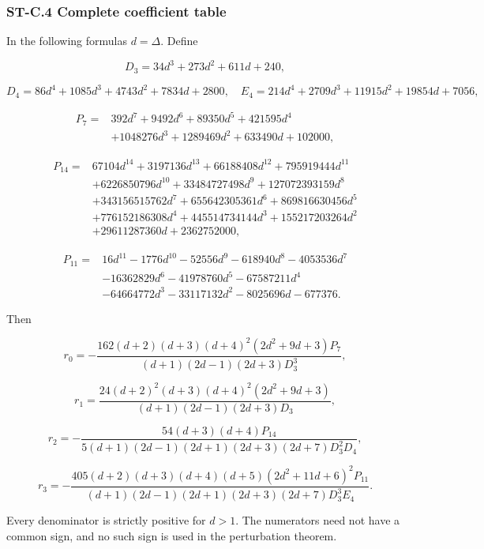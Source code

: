 \documentclass[a4paper,11pt]{article}
\numberwithin{equation}{section}
\begin{document}
\hypertarget{st-c.4-complete-coefficient-table}{%
\subsubsection{ST-C.4 Complete coefficient table}\label{st-c.4-complete-coefficient-table}}

In the following formulas \(d=\Delta\). Define

\[
D_3=34d^3+273d^2+611d+240,
\]

\[
D_4=86d^4+1085d^3+4743d^2+7834d+2800,
\quad
E_4=214d^4+2709d^3+11915d^2+19854d+7056,
\]

\[
\begin{aligned}
P_7={}&392d^7+9492d^6+89350d^5+421595d^4\\
&+1048276d^3+1289469d^2+633490d+102000,
\end{aligned}
\]

\[
\begin{aligned}
P_{14}={}&67104d^{14}+3197136d^{13}+66188408d^{12}
+795919444d^{11}\\
&+6226850796d^{10}+33484727498d^9+127072393159d^8\\
&+343156515762d^7+655642305361d^6+869816630456d^5\\
&+776152186308d^4+445514734144d^3+155217203264d^2\\
&+29611287360d+2362752000,
\end{aligned}
\]

\[
\begin{aligned}
P_{11}={}&16d^{11}-1776d^{10}-52556d^9-618940d^8-4053536d^7\\
&-16362829d^6-41978760d^5-67587211d^4\\
&-64664772d^3-33117132d^2-8025696d-677376.
\end{aligned}
\]

Then

\[
r_0=-\frac{162(d+2)(d+3)(d+4)^2(2d^2+9d+3)P_7}
{(d+1)(2d-1)(2d+3)D_3^3},
\]

\[
r_1=\frac{24(d+2)^2(d+3)(d+4)^2(2d^2+9d+3)}
{(d+1)(2d-1)(2d+3)D_3},
\]

\[
r_2=-\frac{54(d+3)(d+4)P_{14}}
{5(d+1)(2d-1)(2d+1)(2d+3)(2d+7)D_3^2D_4},
\]

\[
r_3=-\frac{405(d+2)(d+3)(d+4)(d+5)(2d^2+11d+6)^2P_{11}}
{(d+1)(2d-1)(2d+1)(2d+3)(2d+7)D_3^3E_4}.
\]

Every denominator is strictly positive for \(d>1\). The numerators need not have a common sign, and no such sign is used in the perturbation theorem.
\end{document}
